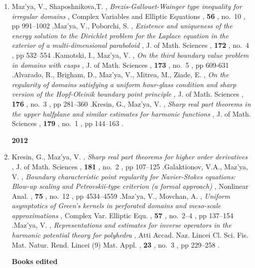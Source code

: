 \documentclass{article}
\newcommand{\authors}[1]{\item #1\ignorespaces}
\renewcommand{\title}[1]{, \textit{#1}\ignorespaces}
\newcommand{\journal}[1]{, {#1}\ignorespaces}
\newcommand{\volume}[1]{, \textbf{#1}\ignorespaces}
\newcommand{\no}[1]{, no.~{#1}\ignorespaces}
\newcommand{\pages}[1]{, pp #1\ignorespaces}
\newcommand{\jitem}[1]{.}
\begin{document}
\begin{enumerate}
\authors{Maz'ya, V., Shaposhnikova,T.}
 \title{Brezis-Gallouet-Wainger type inequality for irregular domains}
 \journal{Complex Variables and Elliptic Equations}
 \volume{56}
 \no{10}
 \pages{991--1002} 
 \jitem

\authors{Maz'ya, V., Poborchi, S.}
\title{Existence and uniqueness of the energy solution to the Dirichlet problem for the Laplace equation in the exterior of a multi-dimensional paraboloid}
\journal{ J. of Math. Sciences}
\volume{172}
\no{4}
\pages{532--554}
\jitem
 
\authors{Kamotski, I.,  Maz'ya, V.}
\title{On the third boundary value problem in domains with cusps}
\journal{J. of Math. Sciences}
\volume{173}
\no{5}
\pages{609-631}
\jitem

\authors{Alvarado, R., Brigham, D., Maz'ya, V., Mitrea, M., Ziade, E.}
\title{On the regularity of domains satisfying a uniform hour-glass condition and sharp version of the Hopf-Oleinik boundary point principle}
\journal{J. of Math. Sciences}
\volume{176}
\no{3}
\pages{281--360}
\jitem


\authors{Kresin, G., Maz'ya, V.}
\title{Sharp real part theorems in the upper halfplane and similar estimates for harmonic functions}
\journal{
J. of Math. Sciences}
\volume{179}
\no{1}
\pages{144--163} 
 \jitem

 
\medskip

{\bf 2012}

 \authors{Kresin, G., Maz'ya, V.}
\title{Sharp real part theorems for higher order derivatives}
\journal{
J. of Math. Sciences}
\volume{181}
\no{2}
\pages{107--125} 
 \jitem

\authors{Galaktionov, V.A., Maz'ya, V.}
\title{Boundary characteristic point regularity for Navier-Stokes equations: Blow-up scaling and Petrovskii-type criterion (a formal approach)}
\journal{Nonlinear Anal.}
\volume{75}
\no{12}
\pages{4534--4559}
 \jitem
 
\authors{Maz'ya, V., Movchan, A.}
\title{Uniform asymptotics of Green's kernels in perforated domains and meso-scale approximations}
\journal{Complex Var. Elliptic Equ.}
\volume{57}
\no{2--4} 
\pages{137--154} 
 \jitem 

\authors{Maz'ya, V.}
\title{Representations and estimates for inverse operators in the harmonic potential theory for polyhedra}
\journal{Atti Accad. Naz. Lincei Cl. Sci. Fis. Mat. Natur. Rend. Lincei (9) Mat. Appl.}
\volume{23}
\no{3}
\pages{229--258}
 \jitem
 
\bigskip

\textbf{\large Books edited}


\end{enumerate}
\end{document}
